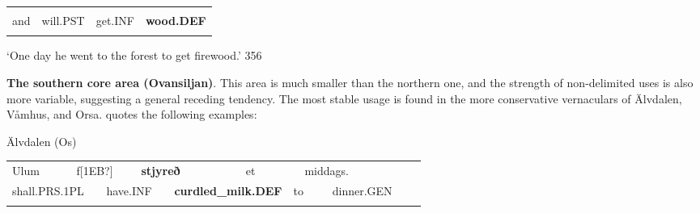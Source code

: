 \begin{tabular}{llll}
\lsptoprule
\multicolumn{4}{l}{å

}\\
and & will.PST & get.INF & {\bfseries wood.DEF}\\
\lspbottomrule
\end{tabular}

\begin{styleTranslation}
‘One day he went to the forest to get firewood.’ 356

\end{styleTranslation}

\begin{styleBodytextC}
\textbf{The southern core area (Ovansiljan)}. This area is much smaller than the northern one, and the strength of non-delimited uses is also more variable, suggesting a general receding tendency. The most stable usage is found in the more conservative vernaculars of Älvdalen, Våmhus, and Orsa. \citet[95]{Levander1909} quotes the following examples:

\end{styleBodytextC}

\begin{listWWNumileveli}
\item 

\begin{styleExample}
Älvdalen (Os)

\end{styleExample}

\end{listWWNumileveli}

\begin{listWWNumxxvleveli}
\item 

\end{listWWNumxxvleveli}

\begin{tabular}{llllllllllll}
\lsptoprule
Ulum & \multicolumn{2}{l}{f[1EB?]

} & \multicolumn{2}{l}{{\bfseries stjyreð}

} & \multicolumn{2}{l}{et

} & \multicolumn{2}{l}{middags.

} & \multicolumn{2}{l}{} & \\
\multicolumn{2}{l}{\footnotemark{}shall.PRS.1PL

} & \multicolumn{2}{l}{have.INF

} & \multicolumn{2}{l}{{\bfseries curdled\_milk.DEF}

} & \multicolumn{2}{l}{to

} & \multicolumn{2}{l}{dinner.GEN

} & \multicolumn{2}{l}{}\\
\lspbottomrule
\end{tabular}


